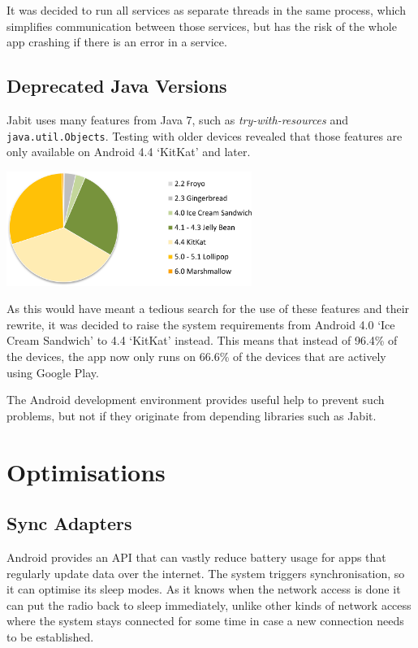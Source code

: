 \documentclass{bfh}
\begin{document}
  It was decided to run all services as separate threads in the same process, which simplifies communication between those services, but has the risk of the whole app crashing if there is an error in a service.

  \subsection{Deprecated Java Versions}
  Jabit uses many features from Java 7, such as \textit{try-with-resources} and \texttt{java.util.Objects}. Testing with older devices revealed that those features are only available on Android 4.4 `KitKat' and later.

  \begin{center}
    \includegraphics[width=0.6\textwidth]{images/android_version_chart_dec_2015.png}
  \end{center}

  As this would have meant a tedious search for the use of these features and their rewrite, it was decided to raise the system requirements from Android 4.0 `Ice Cream Sandwich' to 4.4 `KitKat' instead. This means that instead of 96.4\% of the devices, the app now only runs on 66.6\% of the devices that are actively using Google Play\texttrademark{}.\cite{da:dashboards}

  The Android development environment provides useful help to prevent such problems, but not if they originate from depending libraries such as Jabit.


  \newpage
  \section{Optimisations}
  \subsection{Sync Adapters}
  Android provides an API that can vastly reduce battery usage for apps that regularly update data over the internet. The system triggers synchronisation, so it can optimise its sleep modes. As it knows when the network access is done it can put the radio back to sleep immediately, unlike other kinds of network access where the system stays connected for some time in case a new connection needs to be established.
\end{document}
